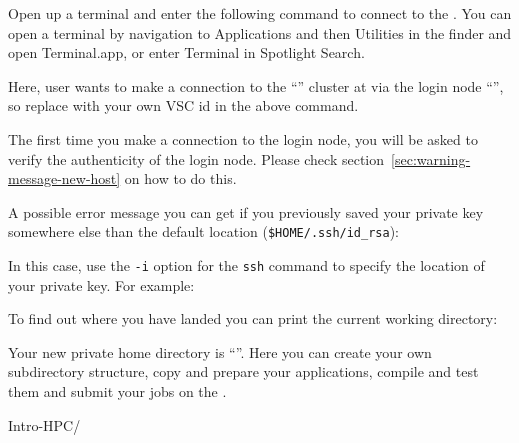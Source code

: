  Open up a terminal and enter the following command to connect to the \hpc.
  \ifmac
  You can open a terminal by navigation to Applications and then Utilities in the finder and open Terminal.app, or enter Terminal in Spotlight Search.
  \fi

\begin{prompt}
\end{prompt}

  Here, user \userid wants to make a connection to the ``\hpcname'' cluster at
  \university via the login node ``\loginnode'', so replace \userid with your own
  VSC id in the above command.

  The first time you make a connection to the login node, you will be asked to
  verify the authenticity of the login node. Please check section~\ref{sec:warning-message-new-host}
  on how to do this.

A possible error message you can get if you previously saved your private key
somewhere else than the default location (\lstinline|$HOME/.ssh/id_rsa|):

\begin{prompt}
\end{prompt}

In this case, use the \lstinline|-i| option for the \lstinline|ssh| command to specify the location
of your private key. For example:

\begin{prompt}
\end{prompt}

\fi

To find out where you have landed you can print the current working directory:

\begin{prompt}
\end{prompt}


Your new private home directory is ``\homedir''.
Here you can create your own subdirectory structure, copy and prepare your
applications, compile and test them and submit your jobs on the \hpc.

\begin{prompt}
Intro-HPC/
\end{prompt}


